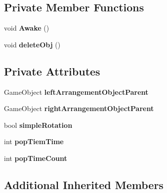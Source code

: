 \subsection*{Private Member Functions}
\begin{DoxyCompactItemize}
\item 
\mbox{\label{class_object_arrangement_system_a359cd1baccfcafce9b64daf2f8fa4d93}} 
void {\bfseries Awake} ()
\item 
\mbox{\label{class_object_arrangement_system_a17a2933d5615f8cc060d5b35fff201b1}} 
void {\bfseries delete\+Obj} ()
\end{DoxyCompactItemize}
\subsection*{Private Attributes}
\begin{DoxyCompactItemize}
\item 
\mbox{\label{class_object_arrangement_system_a4ff3d4992e454a65d50bcb7d3eca9d41}} 
Game\+Object {\bfseries left\+Arrangement\+Object\+Parent}
\item 
\mbox{\label{class_object_arrangement_system_af26cae38dea51c9c507c057f4833fd55}} 
Game\+Object {\bfseries right\+Arrangement\+Object\+Parent}
\item 
\mbox{\label{class_object_arrangement_system_a4b2f012832884fb93c011017c9f699ad}} 
bool {\bfseries simple\+Rotation}
\item 
\mbox{\label{class_object_arrangement_system_a0b29cad9a53bdb2bfea67b5861b44887}} 
int {\bfseries pop\+Tiem\+Time}
\item 
\mbox{\label{class_object_arrangement_system_af0659e180602d1ad9cb883387ab75680}} 
int {\bfseries pop\+Time\+Count}
\end{DoxyCompactItemize}
\subsection*{Additional Inherited Members}


